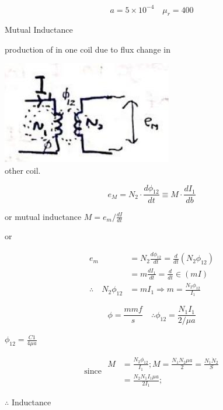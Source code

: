\documentclass[12pt, a4paper]{article}
\begin{document}
$$
	a=5 \times 10^{-4} \quad \mu_{r}=400
$$

Mutual Inductance

production of in one coil due to flux change in

\includegraphics[max width=\textwidth, center]{2024_06_15_ae1c13e212c06c234cc4g-09(1)}\\
other coil.

$$
	e_{M}=N_{2} \cdot \frac{d \phi_{12}}{d t} \equiv M \cdot \frac{d I_{1}}{d b}
$$

or mutual inductance $M=e_{m} / \frac{d I}{d t}$

or

$$
	\begin{aligned}
		e_{m}                            & =N_{2} \frac{d \phi_{12}}{d t}=\frac{d}{d t}\left(N_{2} \phi_{12}\right) \\
		                                 & =m \frac{d I_{1}}{d t}=\frac{d}{d t} \in(m I)                            \\
		\therefore \quad N_{2} \phi_{12} & =m I_{1} \Rightarrow m=\frac{N_{2} \phi_{12}}{I_{1}}
	\end{aligned}
$$

$$
	\phi=\frac{m m f}{s} \quad \therefore \phi_{12}=\frac{N_{1} I_{1}}{2 / \mu a}
$$

$\phi_{12}=\frac{C 1}{4 \mu a}$

$$
	\text { since } \begin{aligned}
		M & =\frac{N_{2} \phi_{12}}{I_{1}} ; M=\frac{N_{1} N_{2} \mu a}{2}=\frac{N_{1} \dot{N}_{2}}{S} \\
		  & =\frac{N_{2} N_{1} I_{1} \mu a}{2 I_{1}} ;
	\end{aligned}
$$

$\therefore$ Inductance
\end{document}
